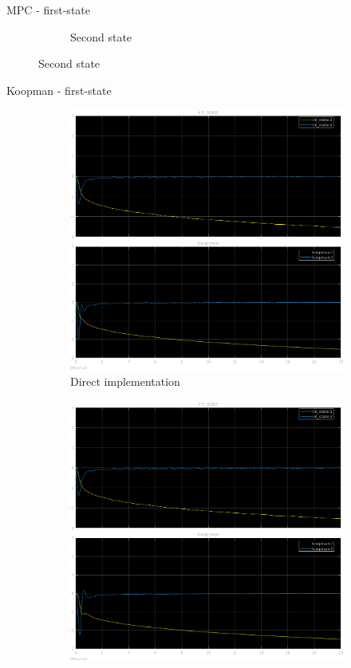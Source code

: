 \documentclass{beamer}
\begin{document}
\begin{frame}{MPC - first-state}
\begin{figure}
\begin{subfigure}[b]{0.45\textwidth}
            \caption{Second state}
        \end{subfigure}
    \end{figure}
\end{frame}

\begin{frame}{Koopman - first-state}
    \begin{figure}
        \centering
        \begin{subfigure}[b]{0.45\textwidth}
            \centering
            \includegraphics[width=\textwidth]{first_koopman_direct.png}
            \caption{Direct implementation}
        \end{subfigure}
        \hfill
        \begin{subfigure}[b]{0.45\textwidth}
            \centering
            \includegraphics[width=\textwidth]{first_koopman_differential.png}

\end{subfigure}
\end{figure}
\end{frame}
\end{document}
